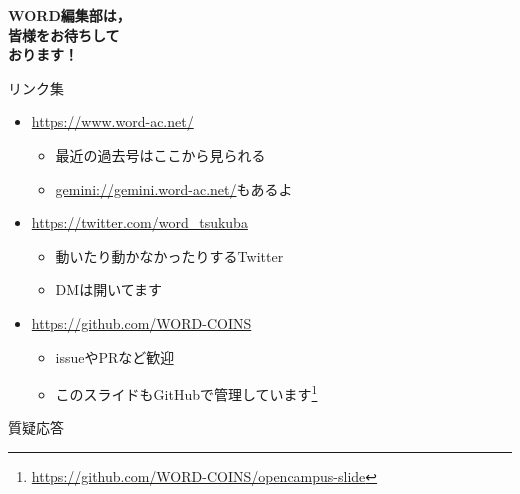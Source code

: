 \documentclass[lualatex]{beamer}
\begin{document}
\begin{frame}[plain]
 \begin{center}
  \Huge\textbf{WORD編集部は，\\皆様をお待ちして\\おります！}
 \end{center}
\end{frame}

\begin{frame}[plain]{リンク集}
 \begin{itemize}
  \item \url{https://www.word-ac.net/}
  \begin{itemize}
   \item 最近の過去号はここから見られる
   \item \url{gemini://gemini.word-ac.net/}もあるよ
  \end{itemize}
  \item \url{https://twitter.com/word\_tsukuba}
  \begin{itemize}
   \item 動いたり動かなかったりするTwitter
   \item DMは開いてます
  \end{itemize}
  \item \url{https://github.com/WORD-COINS}
  \begin{itemize}
   \item issueやPRなど歓迎
   \item このスライドもGitHubで管理しています\footnote{\url{https://github.com/WORD-COINS/opencampus-slide}}
  \end{itemize}
 \end{itemize}
\end{frame}
\begin{frame}[plain]
 \begin{center}
  質疑応答
 \end{center}
\end{frame}
\end{document}
